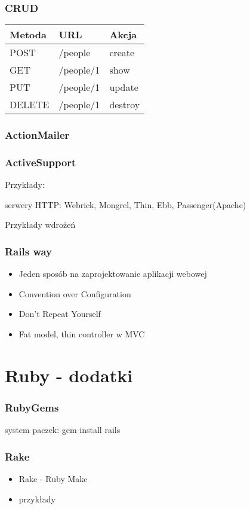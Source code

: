 \documentclass[12t]{beamer}
\begin{document}
\begin{frame}
  \frametitle{CRUD}
		\begin{tabular}{l|l|l}
			Metoda & URL & Akcja \\
			\hline
			POST & /people & create \\
			\hline
			GET & /people/1 & show \\
			\hline
			PUT & /people/1 & update \\
			\hline
			DELETE & /people/1 & destroy \\
		\end{tabular}
\end{frame}

\begin{frame}
  \frametitle{ActionMailer}
\end{frame}

\begin{frame}
  \frametitle{ActiveSupport}
	Przykłady:
	
\end{frame}

\begin{frame}
  serwery HTTP: Webrick, Mongrel, Thin, Ebb, Passenger(Apache)
\end{frame}

\begin{frame}
  Przykłady wdrożeń
\end{frame}

\begin{frame}
  \frametitle{Rails way}
  \begin{itemize}
  \item Jeden sposób na zaprojektowanie aplikacji webowej
  \item Convention over Configuration
  \item Don't Repeat Yourself
  \item Fat model, thin controller w MVC
  \end{itemize}
\end{frame}

\section{Ruby - dodatki}
\begin{frame}
  \frametitle{RubyGems}
  system paczek: gem install rails
\end{frame}

\begin{frame}
  \frametitle{Rake}
  \begin{itemize}
  \item Rake - Ruby Make
  \item przykłady
  \end{itemize}
\end{frame}
\end{document}
